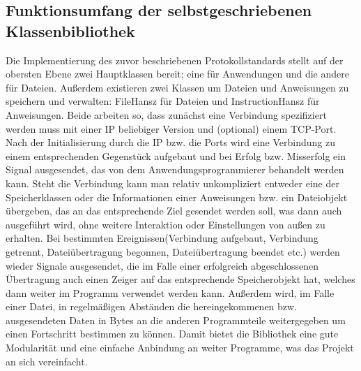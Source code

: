 \subsection{Funktionsumfang der selbstgeschriebenen Klassenbibliothek}
Die Implementierung des zuvor beschriebenen Protokollstandards stellt auf der obersten Ebene zwei Hauptklassen bereit; eine für Anwendungen und die andere für Dateien.
Außerdem existieren zwei Klassen um Dateien und Anweisungen zu speichern und verwalten: FileHansz für Dateien und InstructionHansz für Anweisungen.
Beide arbeiten so, dass zunächst eine Verbindung spezifiziert werden muss mit einer IP beliebiger Version und (optional) einem TCP-Port.
Nach der Initialisierung durch die IP bzw. die Ports wird eine Verbindung zu einem entsprechenden Gegenstück aufgebaut und bei Erfolg bzw. Misserfolg ein Signal ausgesendet, das von dem Anwendungsprogrammierer behandelt werden kann.
Steht die Verbindung kann man relativ unkompliziert entweder eine der Speicherklassen oder die Informationen einer Anweisungen bzw. ein Dateiobjekt übergeben, das an das entsprechende Ziel gesendet werden soll, was dann auch ausgeführt wird, ohne weitere Interaktion oder Einstellungen von außen zu erhalten.
Bei bestimmten Ereignissen(Verbindung aufgebaut, Verbindung getrennt, Dateiübertragung begonnen, Dateiübertragung beendet etc.) werden wieder Signale ausgesendet, die im Falle einer erfolgreich abgeschlossenen Übertragung auch einen Zeiger auf das entsprechende Speicherobjekt hat, welches dann weiter im Programm verwendet werden kann.
Außerdem wird, im Falle einer Datei, in regelmäßigen Abständen die hereingekommenen bzw. ausgesendeten Daten in Bytes an die anderen Programmteile weitergegeben um einen Fortschritt bestimmen zu können.
Damit bietet die Bibliothek eine gute Modularität und eine einfache Anbindung an weiter Programme, was das Projekt an sich vereinfacht.

